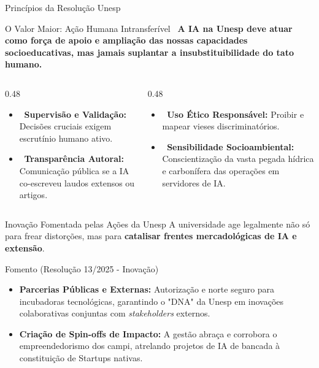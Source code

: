 \documentclass[aspectratio=169,12pt]{beamer}
\begin{document}
\begin{frame}{Princípios da Resolução Unesp}
    \begin{alertblock}{O Valor Maior: Ação Humana Intransferível}
        \centering
        \faUsers\, \textbf{A IA na Unesp deve atuar como força de apoio e ampliação das nossas capacidades socioeducativas, mas jamais suplantar a insubstituibilidade do tato humano.}
    \end{alertblock}
    
    \begin{columns}[T]
        \begin{column}{0.48\textwidth}
            \begin{itemize}
                \item \textbf{\faUserCheck\, Supervisão e Validação:} Decisões cruciais exigem escrutínio humano ativo.
                \item \textbf{\faBullhorn\, Transparência Autoral:} Comunicação pública se a IA co-escreveu laudos extensos ou artigos.
            \end{itemize}
        \end{column}
        \begin{column}{0.48\textwidth}
            \begin{itemize}
                \item \textbf{\faBalanceScale\, Uso Ético Responsável:} Proibir e mapear vieses discriminatórios.
                \item \textbf{\faGlobe\, Sensibilidade Socioambiental:} Conscientização da vasta pegada hídrica e carbonífera das operações em servidores de IA.
            \end{itemize}
        \end{column}
    \end{columns}
\end{frame}

\begin{frame}{Inovação Fomentada pelas Ações da Unesp}
    A universidade age legalmente não só para frear distorções, mas para \textbf{catalisar frentes mercadológicas de IA e extensão}.
    
    \begin{block}{Fomento (Resolução 13/2025 - Inovação)}
        \begin{itemize}
            \item \textbf{Parcerias Públicas e Externas:} Autorização e norte seguro para incubadoras tecnológicas, garantindo o "DNA" da Unesp em inovações colaborativas conjuntas com \textit{stakeholders} externos.
            \item \textbf{Criação de Spin-offs de Impacto:} A gestão abraça e corrobora o empreendedorismo dos campi, atrelando projetos de IA de bancada à constituição de Startups nativas.
        \end{itemize}
    \end{block}
\end{frame}
\end{document}
